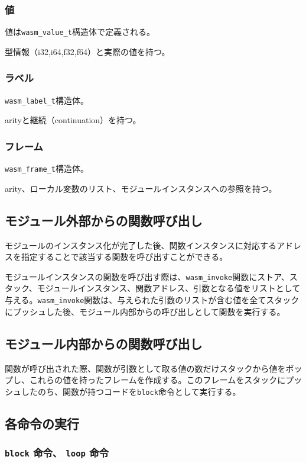 \subsubsection{値}
値は\verb|wasm_value_t|構造体で定義される。

型情報（i32,i64,f32,f64）と実際の値を持つ。

\subsubsection{ラベル}
\verb|wasm_label_t|構造体。

arityと継続（continuation）を持つ。

\subsubsection{フレーム}
\verb|wasm_frame_t|構造体。

arity、ローカル変数のリスト、モジュールインスタンスへの参照を持つ。

\subsection{モジュール外部からの関数呼び出し}

モジュールのインスタンス化が完了した後、関数インスタンスに対応するアドレスを指定することで該当する関数を呼び出すことができる。

モジュールインスタンスの関数を呼び出す際は、\verb|wasm_invoke|関数にストア、スタック、モジュールインスタンス、関数アドレス、引数となる値をリストとして与える。\verb|wasm_invoke|関数は、与えられた引数のリストが含む値を全てスタックにプッシュした後、モジュール内部からの呼び出しとして関数を実行する。

\subsection{モジュール内部からの関数呼び出し}

関数が呼び出された際、関数が引数として取る値の数だけスタックから値をポップし、これらの値を持ったフレームを作成する。このフレームをスタックにプッシュしたのち、関数が持つコードを\verb|block|命令として実行する。

\subsection{各命令の実行}

\subsubsection{{\tt block} 命令、 {\tt loop} 命令}

